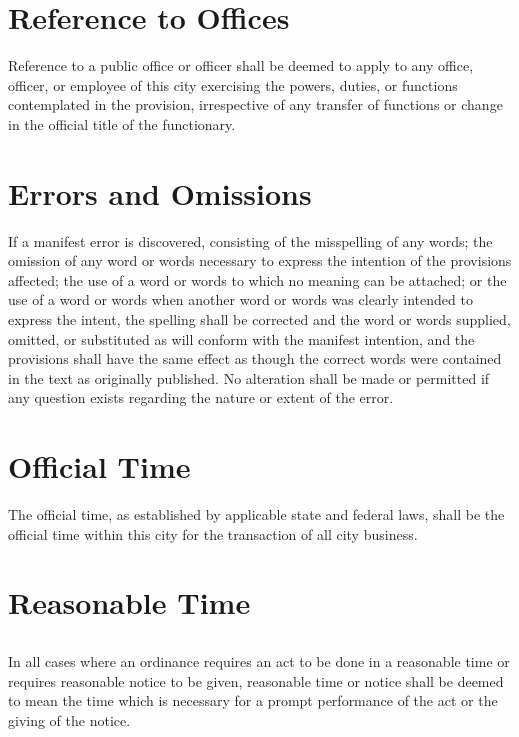 \section{Reference to Offices}
Reference to a public office or officer shall be deemed to apply to any office, officer, or employee of this city exercising the powers, duties, or functions contemplated in the provision, irrespective of any transfer of functions or change in the official title of the functionary.



\section{Errors and Omissions}
If a manifest error is discovered, consisting of the misspelling of any words; the omission of any word or words necessary to express the intention of the provisions affected; the use of a word or words to which no meaning can be attached; or the use of a word or words when another word or words was clearly intended to express the intent, the spelling shall be corrected and the word or words supplied, omitted, or substituted as will conform with the manifest intention, and the provisions shall have the same effect as though the correct words were contained in the text as originally published.  No alteration shall be made or permitted if any question exists regarding the nature or extent of the error.



\section{Official Time}
The official time, as established by applicable state and federal laws, shall be the official time within this city for the transaction of all city business.



\section{Reasonable Time}
\subsection{}
In all cases where an ordinance requires an act to be done in a reasonable time or requires reasonable notice to be given, reasonable time or notice shall be deemed to mean the time which is necessary for a prompt performance of the act or the giving of the notice.
